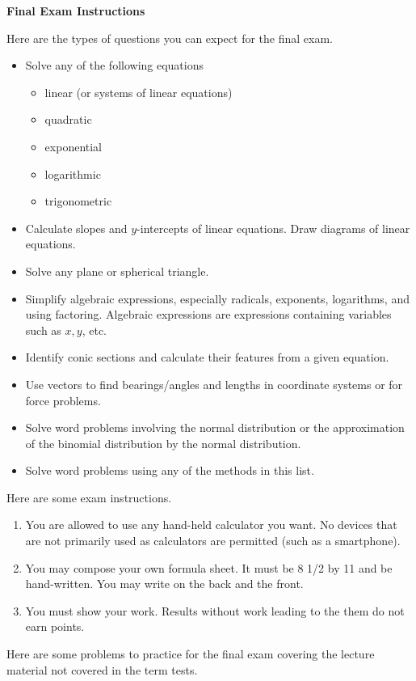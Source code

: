 \documentclass[11pt]{article}
\begin{document}
\textbf{Final Exam Instructions}

Here are the types of questions you can expect for the final exam.

\begin{itemize}
\item Solve any of the following equations
  \begin{itemize}
  \item linear (or systems of linear equations)
  \item quadratic
  \item exponential
  \item logarithmic
  \item trigonometric
  \end{itemize}
\item Calculate slopes and $y$-intercepts of linear equations. Draw
  diagrams of linear equations.
\item Solve any plane or spherical triangle.
\item Simplify algebraic expressions, especially radicals, exponents,
  logarithms, and using factoring. Algebraic expressions are
  expressions containing variables such as $x,y$, etc.
\item Identify conic sections and calculate their features from a
  given equation.
\item Use vectors to find bearings/angles and lengths in coordinate
  systems or for force problems.
\item Solve word problems involving the normal distribution or the
  approximation of the binomial distribution by the normal
  distribution.
\item Solve word problems using any of the methods in this list.
\end{itemize}

Here are some exam instructions.

\begin{enumerate}
\item You are allowed to use any hand-held calculator you want. No
  devices that are not primarily used as calculators are permitted
  (such as a smartphone).
\item You may compose your own formula sheet. It must be 8 1/2 by 11
  and be hand-written. You may write on the back and the front.
\item You must show your work. Results without work leading to the
  them do not earn points.
\end{enumerate}

Here are some problems to practice for the final exam covering the
lecture material not covered in the term tests.
\end{document}
